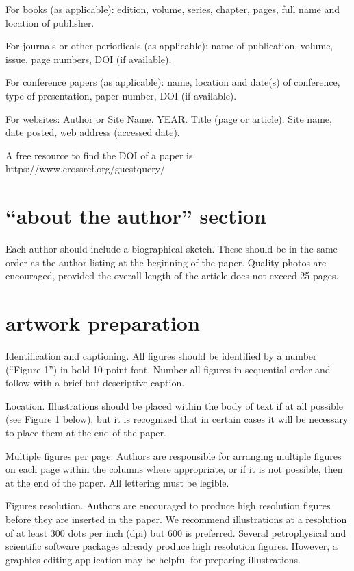 \documentclass[10pt,twocolumn,twoside]{article}
\begin{document}
For books (as applicable): edition, volume, series, chapter, pages, full name and location of publisher.

For journals or other periodicals (as applicable): name of publication, volume, issue, page numbers, DOI (if available).

For conference papers (as applicable): name, location and date(s) of conference, type of presentation, paper number, DOI (if available). 

For websites: Author or Site Name. YEAR. Title (page or article). Site name, date posted, web address (accessed date). 

A free resource to find the DOI of a paper is https://www.crossref.org/guestquery/ 

\section{“about the author” section}
Each author should include a biographical sketch. These should be in the same order as the author listing at the beginning of the paper. Quality photos are encouraged, provided the overall length of the article does not exceed 25 pages.

\section{artwork preparation}
Identification and captioning. All figures should be identified by a number (“Figure 1”) in bold 10-point font. Number all figures in sequential order and follow with a brief but descriptive caption. 

Location. Illustrations should be placed within the body of text if at all possible (see Figure 1 below), but it is recognized that in certain cases it will be necessary to place them at the end of the paper.

Multiple figures per page. Authors are responsible for arranging multiple figures on each page within the columns where appropriate, or if it is not possible, then at the end of the paper. All lettering must be legible.

Figures resolution. Authors are encouraged to produce high resolution figures before they are inserted in the paper. We recommend illustrations at a resolution of at least 300 dots per inch (dpi) but 600 is preferred. Several petrophysical and scientific software packages already produce high resolution figures. However, a graphics-editing application may be helpful for preparing illustrations. 
\end{document}
